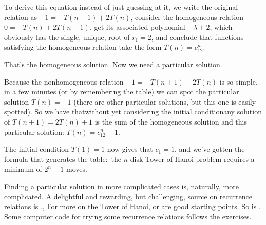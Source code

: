 To derive this equation instead of just guessing at it, 
we write the original relation as $-1=-T(n+1)+2T(n)$, consider 
the homogeneous relation $0=-T(n)+2T(n-1)$, 
get its associated polynomial $-\lambda+2$, 
which obviously has the single, unique, root of $r_1=2$, and conclude that
functions satisfying the homogeneous relation take the form $T(n)=c_12^n$.

That's the homogeneous solution.
Now we need a particular solution. 

Because the nonhomogeneous relation $-1=-T(n+1)+2T(n)$ is so simple, 
in a few minutes (or by remembering the table) 
we can spot the particular solution $T(n)=-1$ 
(there are other particular 
solutions, but this one is easily spotted).
So we have that\Dash without yet considering the initial condition\Dash any solution
of $T(n+1)=2T(n)+1$ is the sum of the homogeneous solution and this
particular solution: $T(n)=c_12^n-1$.

The initial condition $T(1)=1$ now gives that $c_1=1$, and we've gotten
the formula that generates the table:~the $n$-disk Tower of Hanoi problem 
requires a minimum of $2^n-1$ moves.

Finding a particular solution in more complicated cases is, naturally,
more complicated.
A delightful and rewarding, but challenging, source on recurrence relations
is \cite{GrahamKnuthPatashnik}.,
For more on the Tower of Hanoi, \cite{Ball} or \cite{Gardner57}
are good starting points. 
So is \cite{Hofstadter}.
Some computer code for trying some recurrence relations follows the 
exercises.


